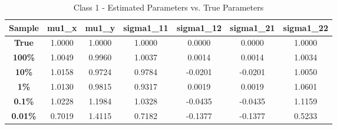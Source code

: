 \documentclass{article}
\begin{document}
\begin{table}[H]
\centering
\small
\caption{Class 1 - Estimated Parameters vs. True Parameters}
\vspace{0.5em}
\begin{tabular}{ccccccc}
\toprule
\textbf{Sample} & \textbf{mu1\_x} & \textbf{mu1\_y} & \textbf{sigma1\_11} & \textbf{sigma1\_12} & \textbf{sigma1\_21} & \textbf{sigma1\_22} \\
\midrule
\textbf{True} & \cellcolor{trueyellow} 1.0000 & \cellcolor{trueyellow} 1.0000 & \cellcolor{trueyellow} 1.0000 & \cellcolor{trueyellow} 0.0000 & \cellcolor{trueyellow} 0.0000 & \cellcolor{trueyellow} 1.0000 \\
\textbf{100\%} & \cellcolor{meangreen} 1.0049 & \cellcolor{meangreen} 0.9960 & \cellcolor{sigmablue} 1.0037 & \cellcolor{offpurple} 0.0014 & \cellcolor{offpurple} 0.0014 & \cellcolor{sigmablue} 1.0034 \\
\textbf{10\%} & \cellcolor{meangreen} 1.0158 & \cellcolor{meangreen} 0.9724 & \cellcolor{sigmablue} 0.9784 & \cellcolor{offpurple} -0.0201 & \cellcolor{offpurple} -0.0201 & \cellcolor{sigmablue} 1.0050 \\
\textbf{1\%} & \cellcolor{meangreen} 1.0130 & \cellcolor{meangreen} 0.9815 & \cellcolor{sigmablue} 0.9317 & \cellcolor{offpurple} 0.0019 & \cellcolor{offpurple} 0.0019 & \cellcolor{sigmablue} 1.0601 \\
\textbf{0.1\%} & \cellcolor{meangreen} 1.0228 & \cellcolor{meangreen} 1.1984 & \cellcolor{sigmablue} 1.0328 & \cellcolor{offpurple} -0.0435 & \cellcolor{offpurple} -0.0435 & \cellcolor{sigmablue} 1.1159 \\
\textbf{0.01\%} & \cellcolor{meangreen} 0.7019 & \cellcolor{meangreen} 1.4115 & \cellcolor{sigmablue} 0.7182 & \cellcolor{offpurple} -0.1377 & \cellcolor{offpurple} -0.1377 & \cellcolor{sigmablue} 0.5233 \\
\bottomrule
\end{tabular}
\end{table}
\end{document}
